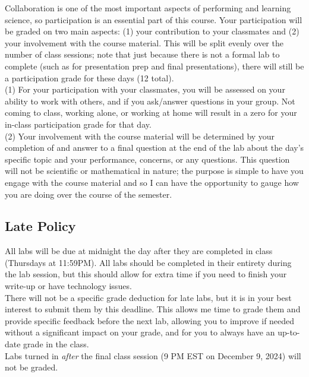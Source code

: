 \documentclass[11pt]{article}
\begin{document}
\noindent Collaboration is one of the most important aspects of performing and learning science, so participation is an essential part of this course. Your participation will be graded on two main aspects: (1) your contribution to your classmates and (2) your involvement with the course material. This will be split evenly over the number of class sessions; note that just because there is not a formal lab to complete (such as for presentation prep and final presentations), there will still be a participation grade for these days (12 total). \\

(1) For your participation with your classmates, you will be assessed on your ability to work with others, and if you ask/answer questions in your group. Not coming to class, working alone, or working at home will result in a zero for your in-class participation grade for that day. \\

(2) Your involvement with the course material will be determined by your completion of and answer to a final question at the end of the lab about the day's specific topic and your performance, concerns, or any questions. This question will not be scientific or mathematical in nature; the purpose is simple to have you engage with the course material and so I can have the opportunity to gauge how you are doing over the course of the semester.

\subsection*{Late Policy}

\noindent All labs will be due at midnight the day after they are completed in class (Thursdays at 11:59PM). All labs should be completed in their entirety during the lab session, but this should allow for extra time if you need to finish your write-up or have technology issues. \\

There will not be a specific grade deduction for late labs, but it is in your best interest to submit them by this deadline. This allows me time to grade them and provide specific feedback before the next lab, allowing you to improve if needed without a significant impact on your grade, and for you to always have an up-to-date grade in the class. \\

Labs turned in \textit{after} the final class session (9 PM EST on December 9, 2024) will not be graded. 
\end{document}
